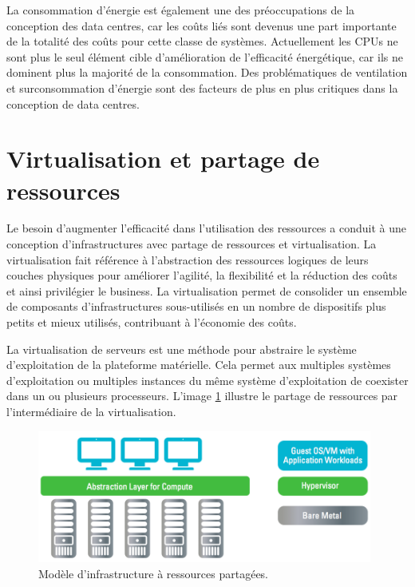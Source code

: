 La consommation d'énergie est également une des préoccupations de la conception des data centres, car les coûts liés sont devenus une part importante de la totalité des coûts pour cette classe de systèmes. Actuellement les CPUs ne sont plus le seul élément cible d'amélioration de l'efficacité énergétique, car ils ne dominent plus la majorité de la consommation. Des problématiques de ventilation et surconsommation d'énergie sont des facteurs de plus en plus critiques dans la conception de data centres.\cite{datacenterAsComputerIntro} \cite{dataCenterEvolution}

\section{Virtualisation et partage de ressources}

Le besoin d'augmenter l'efficacité dans l'utilisation des ressources a conduit à une conception d'infrastructures avec partage de ressources et virtualisation. La virtualisation fait référence à l'abstraction des ressources logiques de leurs couches physiques pour améliorer l'agilité, la flexibilité et la réduction des coûts et ainsi privilégier le business. La virtualisation permet de consolider un ensemble de composants d'infrastructures sous-utilisés en un nombre de dispositifs plus petits et mieux utilisés, contribuant à l'économie des coûts.

La virtualisation de serveurs est une méthode pour abstraire le système d'exploitation de la plateforme matérielle. Cela permet aux multiples systèmes d'exploitation ou multiples instances du même système d'exploitation de coexister dans un ou plusieurs processeurs. L'image \ref{virtinfra} illustre le partage de ressources par l'intermédiaire de la virtualisation.

\begin{figure}[h]
\begin{center}
\includegraphics[width=0.98\textwidth]{images/shared_infa_virt} 
\caption{Modèle d'infrastructure à ressources partagées. \cite{journeySDDC}}\label{virtinfra}
\end{center}
\end{figure}

